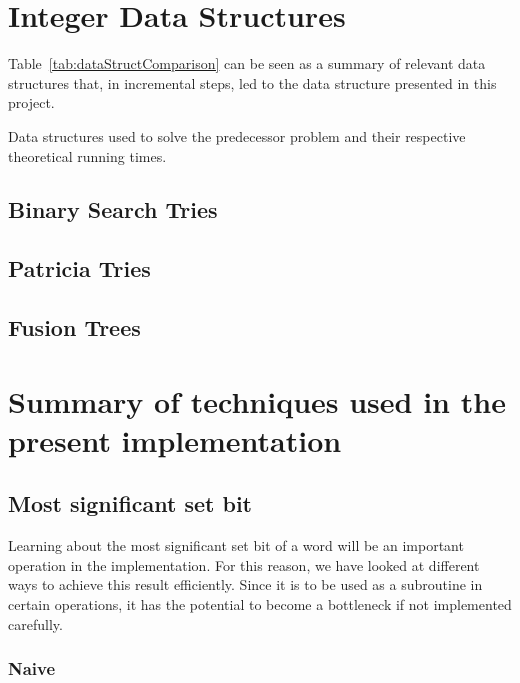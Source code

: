 \section{Integer Data Structures}

Table~\ref{tab:dataStructComparison} can be seen as a summary of relevant data structures that, in incremental steps, led to the data structure presented in this project.

\begin{table}[H]
\centering

\caption[Data structure comparison]{Data structures used to solve the predecessor problem and their respective theoretical running times.}
\label{tab:dataStructComparison}
\end{table}

\subsection{Binary Search Tries}

\subsection{Patricia Tries}

\subsection{Fusion Trees}

\section{Summary of techniques used in the present implementation}

\subsection{Most significant set bit}

Learning about the most significant set bit of a word will be an important operation in the implementation. For this reason, we have looked at different ways to achieve this result efficiently. Since it is to be used as a subroutine in certain operations, it has the potential to become a bottleneck if not implemented carefully.

\subsubsection{Naive}

